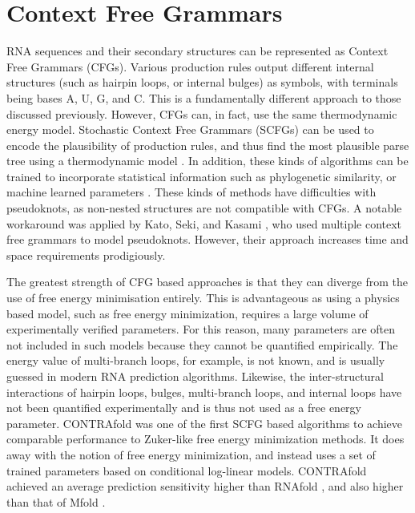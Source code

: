 \documentclass{cshonours}
\begin{document}
\section{Context Free Grammars}
RNA sequences and their secondary structures can be represented as Context Free
Grammars (CFGs). Various production rules output different internal structures (such as
hairpin loops, or internal bulges) as symbols, with terminals being bases A, U, G,
and C. This is a fundamentally different approach to those discussed previously. However, CFGs can, in fact, use the same thermodynamic energy model. Stochastic Context Free Grammars (SCFGs) can be used to encode the plausibility of
production rules, and thus find the most plausible parse tree using a thermodynamic model \cite{rivas2012range}. In addition, these kinds of algorithms can be trained to
incorporate statistical information such as phylogenetic similarity, or machine
learned parameters \cite{rivas2012range}. These kinds of methods have difficulties with pseudoknots, as non-nested structures are not compatible with CFGs.
A notable workaround was applied by Kato, Seki, and Kasami \cite{kato2006stochastic}, who used
multiple context free grammars to model pseudoknots. However, their approach
increases time and space requirements prodigiously.


The greatest strength of CFG based approaches is that they
can diverge from the use of free energy minimisation entirely. This is advantageous as using
a physics based model, such as free energy minimization, requires a large volume
of experimentally verified parameters. For this reason, many parameters are often not included in such models because they cannot be quantified empirically.
The energy value of multi-branch loops, for example, is not known, and is usually
guessed in modern RNA prediction algorithms. Likewise, the inter-structural
interactions of hairpin loops, bulges, multi-branch loops, and internal loops have not been quantified experimentally and is thus not used as a free energy parameter. CONTRAfold \cite{do2006contrafold} was one of the first SCFG based algorithms to achieve
comparable performance to Zuker-like free energy minimization methods. It does
away with the notion of free energy minimization, and instead uses a
set of trained parameters based on conditional log-linear models. CONTRAfold
achieved an average prediction sensitivity higher than RNAfold \cite{lorenz2011viennarna}, and also higher
than that of Mfold \cite{zuker2003mfold}.
\end{document}

